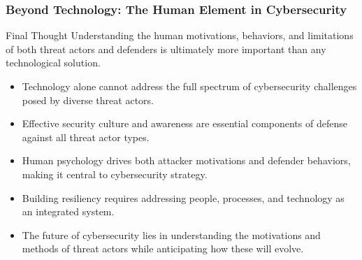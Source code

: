 \documentclass{beamer}
\begin{document}
\begin{frame}
    \frametitle{Beyond Technology: The Human Element in Cybersecurity}
    
    \begin{alertblock}{Final Thought}
        Understanding the human motivations, behaviors, and limitations of both threat actors and defenders is ultimately more important than any technological solution.
    \end{alertblock}
    
    \begin{itemize}
        \item Technology alone cannot address the full spectrum of cybersecurity challenges posed by diverse threat actors.
        \item Effective security culture and awareness are essential components of defense against all threat actor types.
        \item Human psychology drives both attacker motivations and defender behaviors, making it central to cybersecurity strategy.
        \item Building resiliency requires addressing people, processes, and technology as an integrated system.
        \item The future of cybersecurity lies in understanding the motivations and methods of threat actors while anticipating how these will evolve.
    \end{itemize}
\end{frame}
\end{document}
